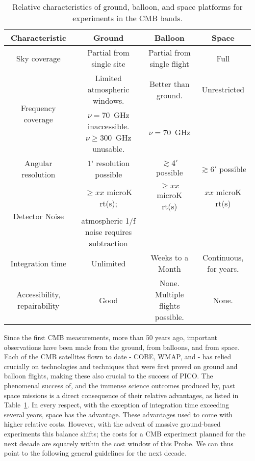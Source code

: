 \documentclass[PICOReport.tex]{subfiles}
\begin{document}
\begin{table}%
\begin{adjustbox}{width=1\textwidth,center}
\begin{tabular}{|c|c|c|c|}
\hline
\bf{Characteristic} & {\bf Ground} & {\bf Balloon} & {\bf Space}  \\ \hline
Sky coverage & Partial from single site & Partial from single flight & Full \\ \hline
\multirow{2}{*}{Frequency coverage} & Limited atmospheric windows.  & Better than ground.  &  Unrestricted \\  
                                     & $\nu=70$~GHz inaccessible. $\nu \ge 300$~GHz unusable. & $\nu=70$~GHz & \\ \hline
      Angular resolution  & 1' resolution possible & $\gtrsim 4'$ possible & $\gtrsim 6'$ possible \\ \hline
\multirow{2}{*}{Detector Noise} & $\ge xx$ microK rt(s);  & $\ge xx$ microK rt(s)  &  $ xx$ microK rt(s) \\  
                                     & atmospheric 1/f noise requires subtraction &  & \\ \hline
Integration time  & Unlimited & Weeks to a Month & Continuous, for years.\\ \hline
Accessibility, repairability & Good & None.  Multiple flights possible.& None.\\
\hline
\end{tabular}
\end{adjustbox}
\vspace{-0.13in}
\caption{ \small \setlength{\baselineskip}{0.95\baselineskip}
Relative characteristics of ground, balloon, and space platforms for experiments in the CMB bands.\label{tab:comparison} }
\vspace{-0.05in}
\end{table}

Since the first \ac{CMB} measurements, more than 50 years ago, important observations have been made from the ground, from balloons, and from space. Each of the CMB satellites flown to date - COBE, WMAP, and \planck - has relied crucially on technologies and techniques that were first proved on ground and balloon flights, making these also crucial to the success of PICO. The phenomenal success of, and the immense science outcomes produced by, past space missions is a direct consequence of their relative advantages, as listed in 
Table~\ref{tab:comparison}. In every respect, with the exception of integration time exceeding several years, space has the advantage. These advantages used to come with higher relative costs. However, with the advent of massive ground-based experiments this balance shifts; the costs for a CMB experiment planned for the next decade are squarely within the cost window of this Probe. We can thus point to the following general guidelines for the next decade. 
\end{document}
